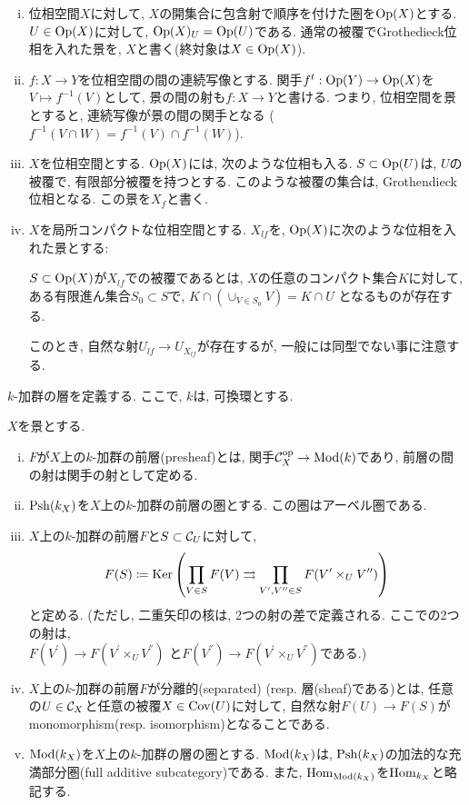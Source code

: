 \documentclass[../main]{subfiles}
\begin{document}
\begin{eg}
  \begin{enumerate}[(i)]
    \item 位相空間$X$に対して,
      $X$の開集合に包含射で順序を付けた圏を$\mathrm{Op}(X)$とする.
      $U\in\mathrm{Op}(X)$に対して, $\mathrm{Op}(X)_U = \mathrm{Op}(U)$である.
      通常の被覆でGrothedieck位相を入れた景を,
      $X$と書く(終対象は$X\in\mathrm{Op}(X)$).
    \item $f:X\to Y$を位相空間の間の連続写像とする.
      関手$f^t:\mathrm{Op}(Y)\to\mathrm{Op}(X)$を$V\mapsto f^{-1}(V)$として,
      景の間の射も$f:X\to Y$と書ける.
      つまり, 位相空間を景とすると,
      連続写像が景の間の関手となる
      ($f^{-1}(V\cap W)=f^{-1}(V)\cap f^{-1}(W)$).
    \item $X$を位相空間とする.
      $\mathrm{Op}(X)$には, 次のような位相も入る.
      $S\subset \mathrm{Op}(U)$は,
      $U$の被覆で, 有限部分被覆を持つとする.
      このような被覆の集合は, Grothendieck位相となる.
      この景を$X_f$と書く.
    \item $X$を局所コンパクトな位相空間とする.
      $X_{lf}$を, $\mathrm{Op}(X)$に次のような位相を入れた景とする:

      $S\subset\mathrm{Op}(X)$が$X_{lf}$での被覆であるとは,
      $X$の任意のコンパクト集合$K$に対して,
      ある有限進ん集合$S_0\subset S$で,
      $K\cap (\cup_{V\in S_0} V) = K\cap U$
      となるものが存在する.

      このとき, 自然な射$U_{lf}\to U_{X_{lf}}$が存在するが,
      一般には同型でない事に注意する.
  \end{enumerate}
\end{eg}

$k$-加群の層を定義する.
ここで, $k$は, 可換環とする.
\begin{dfn}
  $X$を景とする.
  \begin{enumerate}[(i)]
    \item $F$が$X$上の$k$-加群の前層(presheaf)とは,
      関手$\mathcal{C}^{\mathrm{op}}_X \to \mathrm{Mod}(k)$であり,
      前層の間の射は関手の射として定める.
    \item $\mathrm{Psh}(k_X)$を$X$上の$k$-加群の前層の圏とする.
      この圏はアーベル圏である.
    \item $X$上の$k$-加群の前層$F$と$S\subset \mathcal{C}_U$に対して,
      \[
        F(S) \coloneqq
        \mathrm{Ker}\left( \prod_{V\in S}F(V)
        \rightrightarrows
        \prod_{V^\prime,V^{\prime\prime}\in S}F(V^\prime \times_U V^{\prime\prime})\right)
      \]
      と定める.
      (ただし, 二重矢印の核は, 2つの射の差で定義される.
      ここでの2つの射は,
      \\
      $F(V^\prime) \to F(V^\prime \times_U V^\dprime)$
      と$F(V^\dprime) \to F(V^\prime \times_U V^\dprime)$である.)
    \item $X$上の$k$-加群の前層$F$が分離的(separated) (resp. 層(sheaf)である)とは,
      任意の$U\in\mathcal{C}_X$と任意の被覆$X\in\mathrm{Cov}(U)$に対して,
      自然な射$F(U)\to F(S)$がmonomorphism(resp. isomorphism)となることである.
    \item $\mathrm{Mod}(k_X)$を$X$上の$k$-加群の層の圏とする.
      $\mathrm{Mod}(k_X)$は, $\mathrm{Psh}(k_X)$の加法的な充満部分圏(full additive subcategory)である.
      また, $\mathop{\mathrm{Hom}}\nolimits_{\mathrm{Mod}(k_X)}$を$\mathop{\mathrm{Hom}}\nolimits_{k_X}$と略記する.
  \end{enumerate}
\end{dfn}
\end{document}

